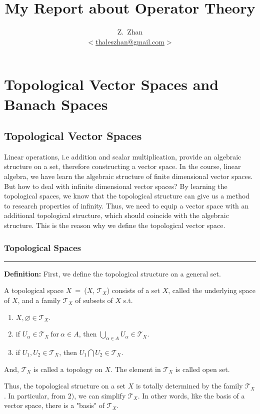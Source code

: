 \documentclass[a4paper,11pt]{report}
\title{My Report about Operator Theory}
\author{Z.~Zhan\\ $<$\href{mailto:thaleszhan@gmail.com}%
            {thaleszhan@gmail.com}$>$}
\begin{document}
\maketitle
\tableofcontents
\chapter{Topological Vector Spaces and Banach Spaces}

\section{Topological Vector Spaces}
Linear operations, i.e addition and scalar multiplication, provide an algebraic structure on a set, therefore constructing a vector space. In the course, linear algebra, we have learn the algebraic structure of finite dimensional vector spaces. But how to deal with infinite dimensional vector spaces? By learning the topological spaces, we know that the topological structure can give us a method to research properties of infinity. Thus, we need to equip a vector space with an additional topological structure, which should coincide with the algebraic structure. This is the reason why we define the topological vector space.

\subsection{Topological Spaces}
\rule{1mm}{1mm} \textbf{Definition:} First, we define the topological structure on a general set.
\begin{defn}
A topological space $X$~=~($X$, $\mathscr{T}_X$) consists of a set $X$, called the underlying space of $X$, and a family $\mathscr{T}_X$ of subsets of $X$ s.t.
	\begin{enumerate}[label=\arabic*)]
		\item $X, \varnothing \in \mathscr{T}_X$.
		\item if $U_\alpha \in \mathscr{T}_X \ \text{for} \ \alpha \in A$, then $\bigcup_{\alpha \in A}U_\alpha \in \mathscr{T}_X$.
		\item if $U_1, U_2 \in \mathscr{T}_X$, then $U_1 \bigcap U_2 \in \mathscr{T}_X$.
	\end{enumerate}
And, $\mathscr{T}_X$ is called a topology on $X$. The element in $\mathscr{T}_X$ is called open set.
\end{defn}

Thus, the topological structure on a set $X$ is totally determined by the family $\mathscr{T}_X$. In particular, from $2)$, we can simplify $\mathscr{T}_X$. In other words, like the basis of a vector space, there is a "basis" of $\mathscr{T}_X$.
\end{document}
